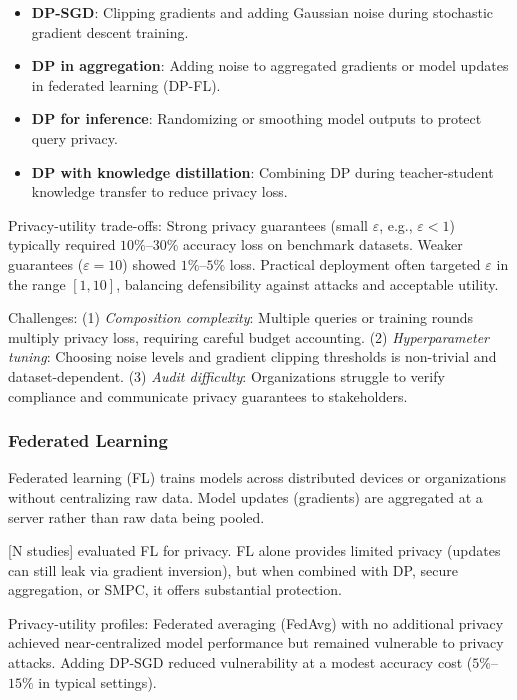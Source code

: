 \documentclass[11pt,a4paper]{article}
\begin{document}
\begin{itemize}
\item \textbf{DP-SGD}: Clipping gradients and adding Gaussian noise during stochastic gradient descent training.
\item \textbf{DP in aggregation}: Adding noise to aggregated gradients or model updates in federated learning (DP-FL).
\item \textbf{DP for inference}: Randomizing or smoothing model outputs to protect query privacy.
\item \textbf{DP with knowledge distillation}: Combining DP during teacher-student knowledge transfer to reduce privacy loss.
\end{itemize}

Privacy-utility trade-offs: Strong privacy guarantees (small $\varepsilon$, e.g., $\varepsilon < 1$) typically required $10\%$–$30\%$ accuracy loss on benchmark datasets. Weaker guarantees ($\varepsilon = 10$) showed $1\%$–$5\%$ loss. Practical deployment often targeted $\varepsilon$ in the range $[1, 10]$, balancing defensibility against attacks and acceptable utility.

Challenges: (1) \textit{Composition complexity}: Multiple queries or training rounds multiply privacy loss, requiring careful budget accounting. (2) \textit{Hyperparameter tuning}: Choosing noise levels and gradient clipping thresholds is non-trivial and dataset-dependent. (3) \textit{Audit difficulty}: Organizations struggle to verify compliance and communicate privacy guarantees to stakeholders.

\subsubsection{Federated Learning}

Federated learning (FL) trains models across distributed devices or organizations without centralizing raw data. Model updates (gradients) are aggregated at a server rather than raw data being pooled.

[N studies] evaluated FL for privacy. FL alone provides limited privacy (updates can still leak via gradient inversion), but when combined with DP, secure aggregation, or SMPC, it offers substantial protection.

Privacy-utility profiles: Federated averaging (FedAvg) with no additional privacy achieved near-centralized model performance but remained vulnerable to privacy attacks. Adding DP-SGD reduced vulnerability at a modest accuracy cost ($5\%$–$15\%$ in typical settings).
\end{document}
